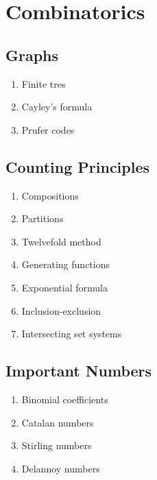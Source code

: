 \section{Combinatorics}
\subsection{Graphs}
  \begin{enumerate}
    \item Finite tres
    \item Cayley's formula
    \item Prufer codes
  \end{enumerate}

\subsection{Counting Principles}
  \begin{enumerate}
    \item Compositions
    \item Partitions
    \item Twelvefold method
    \item Generating functions
    \item Exponential formula 
    \item Inclusion-exclusion
    \item Intersecting set systems
  \end{enumerate}

\subsection{Important Numbers}
  \begin{enumerate}
    \item Binomial coefficients
    \item Catalan numbers
    \item Stirling numbers
    \item Delannoy numbers
  \end{enumerate}
